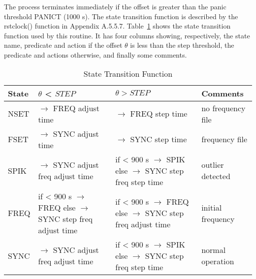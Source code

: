The process terminates immediately if the offset is greater than the
panic threshold PANICT (1000 s). The state transition function is
described by the rstclock() function in Appendix A.5.5.7. Table~\ref{state_transition_function}
shows the state transition function used by this routine. It has
four columns showing, respectively, the state name, predicate and
action if the offset $ \theta $ is less than the step threshold, the
predicate and actions otherwise, and finally some comments.

\begin{table}[htb]
\center
\begin{tabular}{| l | l | l | l |}
\hline
State & $ \theta $ < $ STEP $        & $ \theta > STEP $      & Comments \\
\hline
\hline
NSET & \makecell[l]{$ \rightarrow $ FREQ \\ adjust time} & \makecell[l]{$ \rightarrow $ FREQ \\ step time} & no frequency file \\
FSET & \makecell[l]{$ \rightarrow $ SYNC \\ adjust time} & \makecell[l]{$ \rightarrow $ SYNC \\ step time} & frequency file \\
SPIK & \makecell[l]{$ \rightarrow $ SYNC \\ adjust freq \\ adjust time} & \makecell[l]{if < 900 s $ \rightarrow $ SPIK \\ else $ \rightarrow $ SYNC \\ step freq \\ step time} & outlier detected \\
FREQ & \makecell[l]{if < 900 s $ \rightarrow $ FREQ \\ else $ \rightarrow $ SYNC \\ step freq \\ adjust time} & \makecell[l]{if < 900 s $ \rightarrow $ FREQ \\ else $ \rightarrow $ SYNC \\ step freq \\ adjust time} & initial frequency \\
SYNC & \makecell[l]{$ \rightarrow $ SYNC \\ adjust freq \\ adjust time} & \makecell[l]{if < 900 s $ \rightarrow $ SPIK \\ else $ \rightarrow $ SYNC \\ step freq \\ step time} & normal operation \\
\hline
\end{tabular}
\caption{State Transition Function}
\label{state_transition_function}
\end{table}


